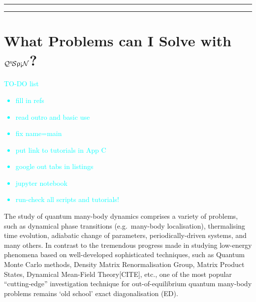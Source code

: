\documentclass{SciPost}
\newcommand\0{\scalebox{-1}[1]{0}}
\newcommand{\qspin}{$\mathcal{Q}^{\mathrm{u}}\!\mathcal{S}\uprho\mathrm{\text{\textexclamdown}}\mathcal{N}$}
\newcommand*{\cyan}{\textcolor{cyan}}
\begin{document}
\vspace{10pt}
\noindent\rule{\textwidth}{1pt}
\tableofcontents\thispagestyle{fancy}
\noindent\rule{\textwidth}{1pt}
\vspace{10pt}


\section{What Problems can I Solve with \qspin?}
\label{sec:intro}

\cyan{TO-DO list
	\begin{itemize}
		\item fill in refs
		\item read outro and basic use
		\item fix name=main
		\item put link to tutorials in App C
		\item google out tabs in listings
		\item jupyter notebook
		\item run-check all scripts and tutorials!
	\end{itemize}}

The study of quantum many-body dynamics comprises a variety of problems, such as dynamical phase transitions (e.g.~many-body localisation), thermalising time evolution, adiabatic change of parameters, periodically-driven systems, and many others. In contrast to the tremendous progress made in studying low-energy phenomena based on well-developed sophisticated techniques, such as Quantum Monte Carlo methods, Density Matrix Renormalisation Group, Matrix Product States, Dynamical Mean-Field Theory[CITE], etc., one of the most popular ``cutting-edge'' investigation technique for out-of-equilibrium quantum many-body problems remains `old school' exact diagonalisation (ED). 
\end{document}
